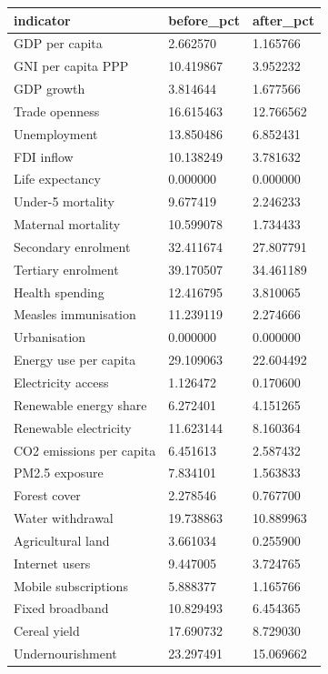 \begin{tabular}{lll}
\hline
indicator & before\_pct & after\_pct \\
\hline
GDP per capita & 2.662570 & 1.165766 \\
GNI per capita PPP & 10.419867 & 3.952232 \\
GDP growth & 3.814644 & 1.677566 \\
Trade openness & 16.615463 & 12.766562 \\
Unemployment & 13.850486 & 6.852431 \\
FDI inflow & 10.138249 & 3.781632 \\
Life expectancy & 0.000000 & 0.000000 \\
Under-5 mortality & 9.677419 & 2.246233 \\
Maternal mortality & 10.599078 & 1.734433 \\
Secondary enrolment & 32.411674 & 27.807791 \\
Tertiary enrolment & 39.170507 & 34.461189 \\
Health spending & 12.416795 & 3.810065 \\
Measles immunisation & 11.239119 & 2.274666 \\
Urbanisation & 0.000000 & 0.000000 \\
Energy use per capita & 29.109063 & 22.604492 \\
Electricity access & 1.126472 & 0.170600 \\
Renewable energy share & 6.272401 & 4.151265 \\
Renewable electricity & 11.623144 & 8.160364 \\
CO2 emissions per capita & 6.451613 & 2.587432 \\
PM2.5 exposure & 7.834101 & 1.563833 \\
Forest cover & 2.278546 & 0.767700 \\
Water withdrawal & 19.738863 & 10.889963 \\
Agricultural land & 3.661034 & 0.255900 \\
Internet users & 9.447005 & 3.724765 \\
Mobile subscriptions & 5.888377 & 1.165766 \\
Fixed broadband & 10.829493 & 6.454365 \\
Cereal yield & 17.690732 & 8.729030 \\
Undernourishment & 23.297491 & 15.069662 \\
\hline
\end{tabular}
